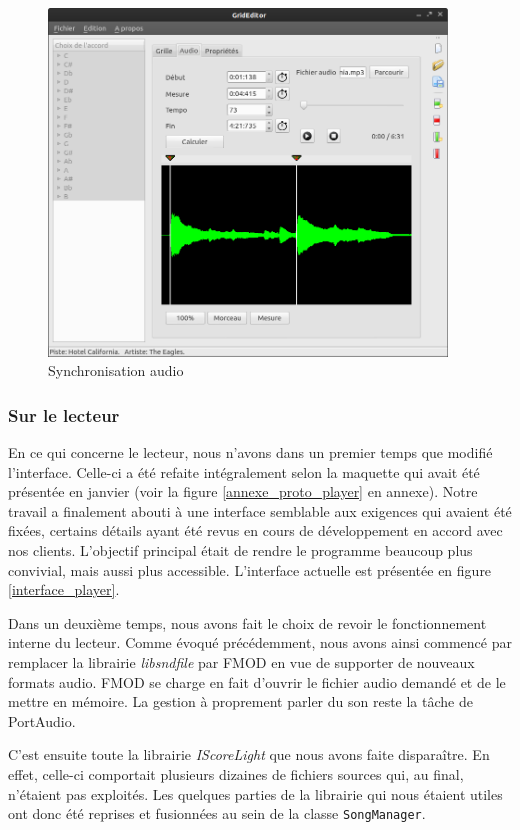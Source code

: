 \documentclass[a4paper,11pt]{article}
\begin{document}
\begin{figure}[H]
\begin{center}
\includegraphics[width=400px]{editor_audiosync}
\caption{Synchronisation audio}
\label{editor_audiosync}
\end{center}
\end{figure}

\subsubsection{Sur le lecteur}

En ce qui concerne le lecteur, nous n'avons dans un premier temps que modifié l'interface. Celle-ci a été refaite intégralement selon la maquette qui avait été présentée en janvier (voir la figure \ref{annexe_proto_player} en annexe). Notre travail a finalement abouti à une interface semblable aux exigences qui avaient été fixées, certains détails ayant été revus en cours de développement en accord avec nos clients. L'objectif principal était de rendre le programme beaucoup plus convivial, mais aussi plus accessible. L'interface actuelle est présentée en figure \ref{interface_player}.

Dans un deuxième temps, nous avons fait le choix de revoir le fonctionnement interne du lecteur. Comme évoqué précédemment, nous avons ainsi commencé par remplacer la librairie \textit{libsndfile} par FMOD en vue de supporter de nouveaux formats audio. FMOD se charge en fait d'ouvrir le fichier audio demandé et de le mettre en mémoire. La gestion à proprement parler du son reste la tâche de PortAudio.

C'est ensuite toute la librairie \textit{IScoreLight} que nous avons faite disparaître. En effet, celle-ci comportait plusieurs dizaines de fichiers sources qui, au final, n'étaient pas exploités. Les quelques parties de la librairie qui nous étaient utiles ont donc été reprises et fusionnées au sein de la classe \texttt{SongManager}.
\end{document}
